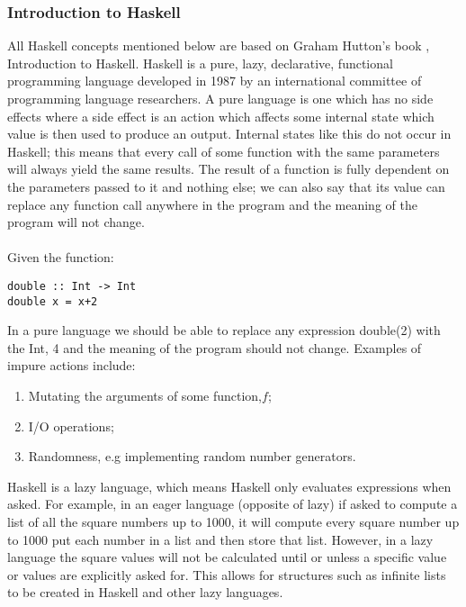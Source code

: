 \documentclass{article}%
\begin{document}
\subsubsection{Introduction to Haskell}
All Haskell concepts mentioned below are based on Graham Hutton’s book \cite{hutton_2007}, Introduction to Haskell. Haskell is a pure, lazy, declarative, functional programming language developed in 1987 by an international committee of programming language researchers. A pure language is one which has no side effects where a side effect is an action which affects some internal state which value is then used to produce an output. Internal states like this do not occur in Haskell; this means that every call of some function with the same parameters will always yield the same results. The result of a function is fully dependent on the parameters passed to it and nothing else; we can also say that its value can replace any function call anywhere in the program and the meaning of the program will not change. \\\\
Given the function:\\
\begin{verbatim}
double :: Int -> Int 
double x = x+2
\end{verbatim}
In a pure language we should be able to replace any expression double(2) with the Int, 4 and the meaning of the program should not change. 
Examples of impure actions include: 
\begin{enumerate}
\item Mutating the arguments of some function,$f$;
\item I/O operations;
\item Randomness, e.g implementing random number generators. 
\end{enumerate}
Haskell is a lazy language, which means Haskell only evaluates expressions when asked. For example, in an eager language (opposite of lazy) if asked to compute a list of all the square numbers up to 1000, it will compute every square number up to 1000 put each number in a list and then store that list. However, in a lazy language the square values will not be calculated until or unless a specific value or values are explicitly asked for. This allows for structures such as infinite lists to be created in Haskell and other lazy languages.\\\\
\end{document}
